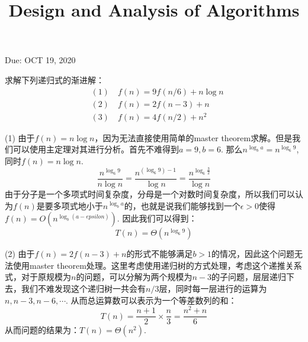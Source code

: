 \documentclass{myhw}
\title{Design and Analysis of Algorithms}
\begin{document}
\begin{center}

\vspace{0.5cm}

Due: OCT 19, 2020

\vspace{0.5cm}
\end{center}
\begin{homeworkProblem}
求解下列递归式的渐进解：
\[
\begin{split}
&(1)\quad f(n)=9f(n/6)+n\log n\\
&(2)\quad f(n)=2f(n-3)+n\\
&(3)\quad f(n)=4f(n/2)+n^2
\end{split}
\]

\end{homeworkProblem}
\begin{solution}
(1) 由于$f(n)=n\log n$，因为无法直接使用简单的master theorem求解。但是我们可以使用主定理对其进行分析。首先不难得到$a=9,b=6$. 那么$n^{\log_b a}=n^{\log_6 9}$, 同时$f(n)=n\log n$. 
\[
\frac{n^{\log_6 9}}{n\log n}=\frac{n^{(\log_6 9) -1}}{\log n}=\frac{n^{\log_6 \frac{3}{2}}}{\log n}
\]
由于分子是一个多项式时间复杂度，分母是一个对数时间复杂度，所以我们可以认为$f(n)$是要多项式地小于$n^{\log_b a}$的，也就是说我们能够找到一个$\epsilon >0$使得$f(n)=O(n^{\log_b (a-epsilon)})$. 因此我们可以得到：
\[
T(n)=\Theta(n^{\log_6 9})
\]
\end{solution}
\begin{solution}
(2) 由于$f(n)=2f(n-3)+n$的形式不能够满足$b>1$的情况，因此这个问题无法使用master theorem处理。这里考虑使用递归树的方式处理，考虑这个递推关系式，对于原规模为$n$的问题，可以分解为两个规模为$n-3$的子问题，层层递归下去，我们不难发现这个递归树一共会有$n/3$层，同时每一层进行的运算为$n,n-3,n-6,\cdots$. 从而总运算数可以表示为一个等差数列的和：
\[
T(n)=\frac{n+1}{2}\times \frac{n}{3}=\frac{n^2+n}{6}
\]
从而问题的结果为：$T(n)=\Theta(n^2)$.
\end{solution}
\end{document}
